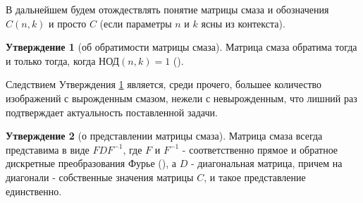 \documentclass[a4paper]{article}
\theoremstyle{definition}
\newtheorem{statement}{Утверждение}[section]
\begin{document}
    В дальнейшем будем отождествлять понятие матрицы смаза и обозначения $C(n, k)$ и просто $C$ (если параметры $n$ и $k$ ясны из контекста).
\vspace{0.3cm}


    \begin{statement}[об обратимости матрицы смаза]
    \label{inverse}
	Матрица смаза обратима тогда и только тогда, когда НОД$(n, k) = 1$ (\cite{cond}).
    \end{statement}


    Следствием Утверждения \ref{inverse} является, среди прочего, большее количество изображений с вырожденным смазом, нежели с невырожденным, что лишний раз подтверждает актуальность поставленной задачи.


    \begin{statement}[о представлении матрицы смаза]
    \label{fourier}
        Матрица смаза всегда представима в виде $FDF^{-1}$, где $F$ и $F^{-1}$ - соответственно прямое и обратное дискретные преобразования Фурье (\cite{fft_def}), а $D$ - диагональная матрица, причем на диагонали - собственные значения матрицы $C$, и такое представление единственно.

    \end{statement}
\end{document}
